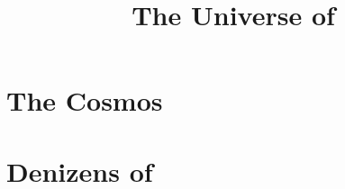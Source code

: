 \documentclass[a4paper,12pt,openany,oneside]{book}
\title{The Universe of \Miith}
\begin{document}
  \stuffatthebeginning



  \part{The Cosmos}
    
    
    
    
  \part{Denizens of \Miith}
    
    
    
    
    \begin{comment}
      \chapter{Azmith}
    \end{comment}
    
    \begin{comment}
      
    \end{comment}



  \begin{comment}
    \part{The Characters of \Miith}
  \end{comment}
    
    
    
    
\end{document}
